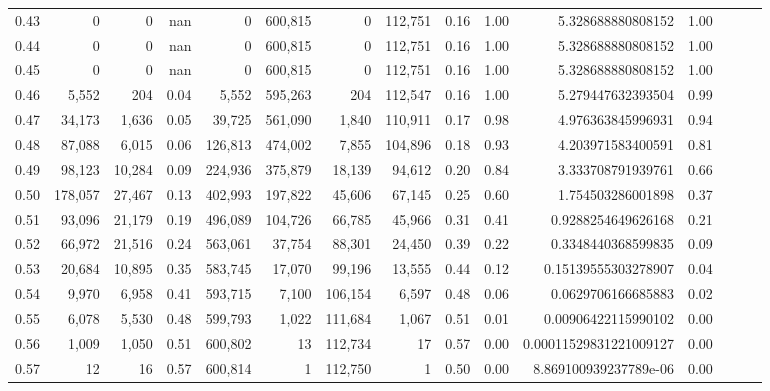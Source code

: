 \begin{tabular}{rrrrrrrrrrrrrrr}
0.43 &        0 &       0 &   nan &        0 &  600,815 &        0 &  112,751 &  0.16 &  1.00 &       5.328688880808152 &      1.00 \\
0.44 &        0 &       0 &   nan &        0 &  600,815 &        0 &  112,751 &  0.16 &  1.00 &       5.328688880808152 &      1.00 \\
0.45 &        0 &       0 &   nan &        0 &  600,815 &        0 &  112,751 &  0.16 &  1.00 &       5.328688880808152 &      1.00 \\
0.46 &    5,552 &     204 &  0.04 &    5,552 &  595,263 &      204 &  112,547 &  0.16 &  1.00 &       5.279447632393504 &      0.99 \\
0.47 &   34,173 &   1,636 &  0.05 &   39,725 &  561,090 &    1,840 &  110,911 &  0.17 &  0.98 &       4.976363845996931 &      0.94 \\
0.48 &   87,088 &   6,015 &  0.06 &  126,813 &  474,002 &    7,855 &  104,896 &  0.18 &  0.93 &       4.203971583400591 &      0.81 \\
0.49 &   98,123 &  10,284 &  0.09 &  224,936 &  375,879 &   18,139 &   94,612 &  0.20 &  0.84 &       3.333708791939761 &      0.66 \\
0.50 &  178,057 &  27,467 &  0.13 &  402,993 &  197,822 &   45,606 &   67,145 &  0.25 &  0.60 &       1.754503286001898 &      0.37 \\
0.51 &   93,096 &  21,179 &  0.19 &  496,089 &  104,726 &   66,785 &   45,966 &  0.31 &  0.41 &      0.9288254649626168 &      0.21 \\
0.52 &   66,972 &  21,516 &  0.24 &  563,061 &   37,754 &   88,301 &   24,450 &  0.39 &  0.22 &      0.3348440368599835 &      0.09 \\
0.53 &   20,684 &  10,895 &  0.35 &  583,745 &   17,070 &   99,196 &   13,555 &  0.44 &  0.12 &     0.15139555303278907 &      0.04 \\
0.54 &    9,970 &   6,958 &  0.41 &  593,715 &    7,100 &  106,154 &    6,597 &  0.48 &  0.06 &      0.0629706166685883 &      0.02 \\
0.55 &    6,078 &   5,530 &  0.48 &  599,793 &    1,022 &  111,684 &    1,067 &  0.51 &  0.01 &     0.00906422115990102 &      0.00 \\
0.56 &    1,009 &   1,050 &  0.51 &  600,802 &       13 &  112,734 &       17 &  0.57 &  0.00 &  0.00011529831221009127 &      0.00 \\
0.57 &       12 &      16 &  0.57 &  600,814 &        1 &  112,750 &        1 &  0.50 &  0.00 &   8.869100939237789e-06 &      0.00 \\

\end{tabular}
